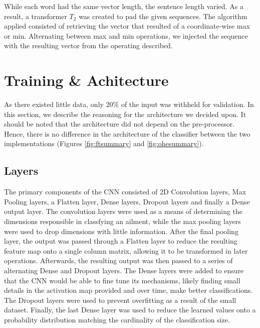 \documentclass[12pt]{report}
\begin{document}
While each word had the same vector length, the sentence length varied. As a result,
a transformer $T_2$ was created to pad the given sequences. The algorithm
applied consisted of retrieving the vector that resulted of a coordinate-wise
max or min. Alternating between max and min operations, we injected the sequence
with the resulting vector from the operating described\cite{2016}.

\section{Training \& Achitecture}
As there existed little data, only 20\% of the input was withheld for validation.
In this section, we describe the reasoning for the architecture we decided upon.
It should be noted that the architecture did not depend on the pre-processor.
Hence, there is no difference in the architecture of the classifier between the two implementations
(Figures \ref{fig:ftsummary} and \ref{fig:ohesummary}).

\subsection{Layers}
The primary components of the CNN consisted of 2D Convolution layers,
Max Pooling layers, a Flatten layer, Dense layers, Dropout layers and finally a Dense output layer.
The convolution layers were used as a means of determining the dimensions
responsible in classfying an ailment, while the max pooling layers were used to drop
dimensions with little information. After the final pooling layer, the output was passed through a
Flatten layer to reduce the resulting feature map onto a single column matrix, allowing it to be
transformed in later operations.
Afterwards, the resulting output was then passed to a series of alternating
Dense and Dropout layers. The Dense layers were added to ensure
that the CNN would be able to fine tune its mechanisms, likely finding small details in the activation map provided
and over time, make better classifications. The Dropout layers were used to prevent overfitting
as a result of the small dataset. Finally, the last Dense layer was used to reduce
the learned values onto a probability distribution matching the cardinality of the classification size\cite{chollet2015keras}.
\end{document}
